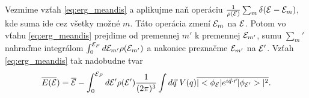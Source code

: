 Vezmime vzťah \eqref{eq:erg_meandis} a aplikujme naň operáciu $\frac{1}{\rho(\mathcal{E})}\sum_{m} \delta(\mathcal{E}-\mathcal{E}_{m})$, kde suma ide cez všetky možné $m$. Táto operácia
zmení $\mathcal{E}_{m}$ na $\mathcal{E}$. Potom vo vťahu \eqref{eq:erg_meandis} prejdime od premennej $m'$ k premennej $\mathcal{E}_{m'}$, sumu $\sum_m'$ nahraďme integrálom
$\int_{0}^{\mathcal{E}_F} d\mathcal{E}_{m'} \rho(\mathcal{E}_{m'})$ a nakoniec preznačme $\mathcal{E}_{m'}$ na $\mathcal{E}'$. Vzťah \eqref{eq:erg_meandis} tak nadobudne tvar
\begin{equation}
\label{eq:erg_meandis modif}
 \overline{E(\mathcal{E}})=\overline{\mathcal{E}}-\int_{0}^{\mathcal{E}_F} d\mathcal{E}' \rho(\mathcal{E}') \frac{1}{(2\pi)^{3}} \int d\vec{q}\ V(q) \overline{|<\phi_{\mathcal{E}}|e^{i\vec{q}\cdot\vec{r}}|\phi_{\mathcal{E}'}>|^2} \text{.}
\end{equation}